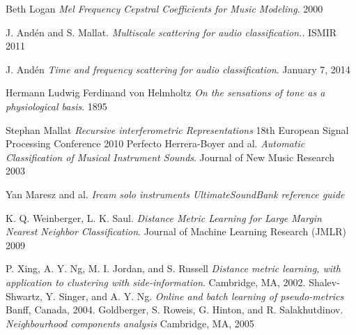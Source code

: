 \documentclass[hidelinks,12pt]{report}
\begin{document}
\newpage
\begin{thebibliography}{2}
Beth Logan
\textit{Mel Frequency Cepstral Coefficients for Music Modeling}. 
2000

J. Andén and S. Mallat. 
\textit{Multiscale scattering for audio classification.}. 
ISMIR 2011

J. Andén 
\textit{Time and frequency scattering for audio classification}. 
January 7, 2014

Hermann Ludwig Ferdinand von Helmholtz
\textit{On the sensations of tone as a physiological basis}.
1895

Stephan Mallat 
\textit{Recursive interferometric Representations}  18th European Signal Processing Conference 2010
Perfecto Herrera-Boyer and al.
\textit{Automatic Classification of Musical Instrument Sounds}.
Journal of New Music Research 2003


Yan Maresz and al.
\textit{Ircam solo instruments UltimateSoundBank reference guide}

K. Q. Weinberger, L. K. Saul. 
\textit{Distance Metric Learning for Large Margin Nearest Neighbor Classification}.
Journal of Machine Learning Research (JMLR) 2009

P. Xing, A. Y. Ng, M. I. Jordan, and S. Russell 
\textit{Distance metric learning, with application to
clustering with side-information}.
 Cambridge, MA, 2002.
 Shalev-Shwartz, Y. Singer, and A. Y. Ng.
 \textit{Online and batch learning of pseudo-metrics}
 Banff, Canada, 2004.
 Goldberger, S. Roweis, G. Hinton, and R. Salakhutdinov.
 \textit{Neighbourhood components analysis}
 Cambridge, MA, 2005
\end{thebibliography}
\end{document}
